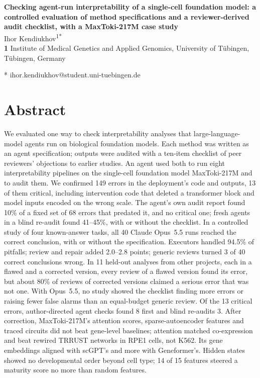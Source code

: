 \documentclass[10pt,letterpaper]{article}
\begin{document}
\vspace*{0.2in}

\begin{flushleft}
{\Large
\textbf{Checking agent-run interpretability of a single-cell foundation model: a controlled evaluation of method specifications and a reviewer-derived audit checklist, with a MaxToki-217M case study}
}
\newline
\\
Ihor Kendiukhov\textsuperscript{1*}
\\
\bigskip
\textbf{1} Institute of Medical Genetics and Applied Genomics, University of T\"ubingen, T\"ubingen, Germany
\\
\bigskip

* ihor.kendiukhov@student.uni-tuebingen.de

\end{flushleft}

\section*{Abstract}
We evaluated one way to check interpretability analyses that
large-language-model agents run on biological foundation models. Each
method was written as an agent specification; outputs were audited with
a ten-item checklist of peer reviewers' objections to earlier studies.
An agent used both to run eight interpretability pipelines on the
single-cell foundation model MaxToki-217M and to audit them. We confirmed 149 errors in the deployment's code and outputs, 13
of them critical, including intervention code that deleted a transformer
block and model inputs encoded on the wrong scale. The agent's own audit report found 10\% of a fixed set of 68
errors that predated it, and no critical one; fresh agents in a blind re-audit found 41--45\%, with or
without the checklist. In a controlled study of four known-answer tasks,
all 40 Claude Opus~5.5 runs reached the correct conclusion, with or
without the specification. Executors handled 94.5\% of pitfalls; review and repair added 2.0--2.8 points; generic reviews
turned 3 of 40 correct conclusions wrong. In 11 held-out analyses from
other projects, each in a flawed and a corrected version, every review
of a flawed version found its error, but about 80\% of
reviews of corrected versions claimed a serious error that was not one.
With Opus~5.5, no study showed the checklist finding more errors or
raising fewer false alarms than an equal-budget generic review. Of the 13 critical errors, author-directed agent checks found 8 first and
blind re-audits 3. After correction, MaxToki-217M's attention scores,
sparse-autoencoder features and traced circuits did not beat gene-level
baselines; attention matched co-expression and beat rewired TRRUST
networks in RPE1 cells, not K562. Its gene embeddings aligned with
scGPT's and more with Geneformer's. Hidden states showed no
developmental order beyond cell type; 14 of 15 features steered a maturity score no more than random features.
\end{document}
